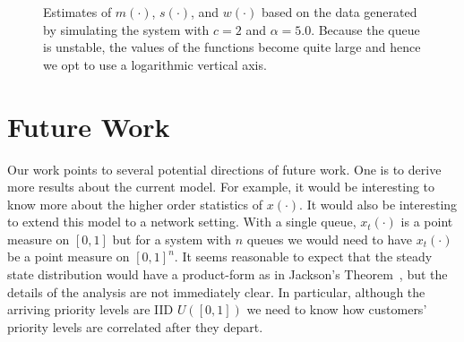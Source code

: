 \documentclass[conference]{IEEEtran}
\begin{document}
\begin{figure}



  \caption{Estimates of $m(\cdot)$, $s(\cdot)$, and $w(\cdot)$ based
    on the data generated by simulating the system with $c = 2$ and
    $\alpha = 5.0$. Because the queue is unstable, the values of the
    functions become quite large and hence we opt to use a logarithmic
    vertical axis.\label{fig:unstable}}
\end{figure}




\section{Future Work\label{sec:future}}
Our work points to several potential directions of future work. One is
to derive more results about the current model. For example, it would
be interesting to know more about the higher order statistics of
$x(\cdot)$. It would also be interesting to extend this model to a
network setting. With a single queue, $x_t(\cdot)$ is a point measure
on $[0, 1]$ but for a system with $n$ queues we would need to have
$x_t(\cdot)$ be a point measure on $[0, 1]^n$. It seems reasonable to
expect that the steady state distribution would have a product-form as
in Jackson's Theorem~\cite{Jackson_1963}, but the details of the
analysis are not immediately clear. In particular, although the
arriving priority levels are IID $U([0, 1])$ we need to know how
customers' priority levels are correlated after they depart.
\end{document}
